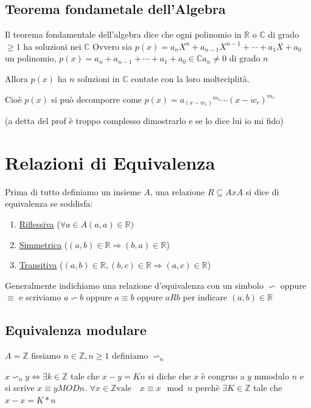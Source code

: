 \documentclass{article}
\theoremstyle{definition}
\begin{document}
\subsection{Teorema fondametale dell'Algebra}
Il teorema fondamentale dell'algebra dice che ogni polinomio in $\mathbb{R}$ o $\mathbb{C}$ di grado $\geq 1$ ha soluzioni nei $\mathbb{C}$ \newline 
Ovvero sia $p(x) = a_n X^n + a_{n-1} X^{n-1} + \cdots + a_1 X + a_0$ un polinomio, $p(x) = a_n  + a_{n-1} + \cdots + a_1 + a_0 \in \mathbb{C} a_n \not = 0$ di grado $n$ \par
Allora $p(x)$ ha $n$ soluzioni in $\mathbb{C}$ contate con la loro molteciplità.\par
Cioè $p(x)$ si può decomporre come $p(x) = {a_(x-w_1)}^{m_1} \cdots {(x-w_r)}^{m_r}$ \newline

(a detta del prof è troppo complesso dimostrarlo e se lo dice lui io mi fido)







\newpage
\section{Relazioni di Equivalenza}
Prima di tutto definiamo un insieme $A$, una relazione $R \subseteq AxA$ si dice di equivalenza se soddisfa:
\begin{enumerate}
        \item \underline{Riflessiva} ($\forall a \in A (a,a) \in \mathbb{R})$
        \item \underline{Simmetrica} ($(a,b) \in \mathbb{R} \Rightarrow (b,a) \in \mathbb{R}$)
        \item \underline{Transitiva} ($(a,b) \in \mathbb{R},(b,c) \in \mathbb{R} \Rightarrow (a,c) \in \mathbb{R}$)
\end{enumerate}

Generalmente indichiamo una relazione d'equivalenza con un simbolo  $\backsim$ oppure $\equiv$ e scriviamo $a \backsim b$ oppure $a \equiv b$ oppure $aRb$ per indicare $(a,b) \in \mathbb{R}$



\subsection{Equivalenza modulare}
$A = \mathbb{Z}$ fissiamo $n \in \mathbb{Z}, n \geq 1$ definiamo $\backsim_n$ \par
$x \backsim_n y \Leftrightarrow \exists k \in \mathbb{Z}$ tale che $x-y = Kn$ si diche che $x$ è congruo a $y$ mmodulo $n$ e si scrive $x \equiv y MOD n$.
$\forall x \in \mathbb{Z} \mbox{vale} \quad x \equiv x \mod n$ perchè $\exists K \in \mathbb{Z}$ tale che $x-x = K*n$ 
\end{document}
